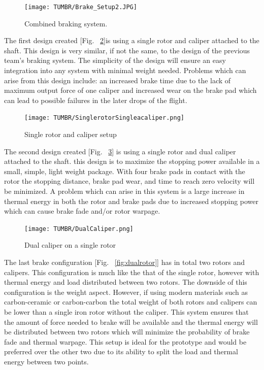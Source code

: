 \begin{figure}[H]
  \centering
  \texttt{[image: TUMBR/Brake\_Setup2.JPG]}
  \caption{\label{fig:com}Combined braking system.}
\end{figure}

\indent\indent The first design created [Fig. ~\ref{fig:single}]is using a single rotor and caliper attached to the shaft. This design is very similar, if not the same, to the design of the previous team's braking system. The simplicity of the design will ensure an easy integration into any system with minimal weight needed. Problems which can arise from this design include: an increased brake time due to the lack of maximum output force of one caliper and increased wear on the brake pad which can lead to possible failures in the later drops of the flight.

\begin{figure}[!ht]
  \centering
  \texttt{[image: TUMBR/SinglerotorSingleacaliper.png]}
  \caption{\label{fig:single}Single rotor and caliper setup}
\end{figure}

\indent\indent The second design created [Fig. ~\ref{fig:Dualcaliper}] is using a single rotor and dual caliper attached to the shaft. this design is to maximize the stopping power available in a small, simple, light weight package. With four brake pads in contact with the rotor the stopping distance, brake pad wear, and time to reach zero velocity will be minimized. A problem which can arise in this system is a large increase in thermal energy in both the rotor and brake pads due to increased stopping power which can cause brake fade and/or rotor warpage.

\begin{figure}[H]
  \centering
  \texttt{[image: TUMBR/DualCaliper.png]}
  \caption{\label{fig:Dualcaliper}Dual caliper on a single rotor}
\end{figure}

\indent\indent The last brake configuration [Fig. ~\ref{fig:dualrotor}] has in total two rotors and calipers. This configuration is much like the that of the single rotor, however with thermal energy and load distributed between two rotors. The downside of this configuration is the weight aspect. However, if using modern materials such as carbon-ceramic or carbon-carbon the total weight of both rotors and calipers can be lower than a single iron rotor without the caliper. This system ensures that the amount of force needed to brake will be available and the thermal energy will be distributed between two rotors which will minimize the probability of brake fade and thermal warpage. This setup is ideal for the prototype and would be preferred over the other two due to its ability to split the load and thermal energy between two points. 

